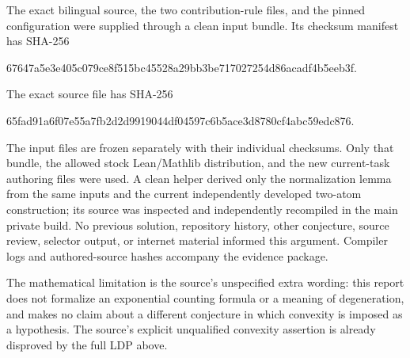 \documentclass[11pt]{article}
\begin{document}
The exact bilingual source, the two contribution-rule files, and the pinned
configuration were supplied through a clean input bundle. Its checksum
manifest has SHA-256
\begin{center}\small\ttfamily
67647a5e3e405c079ce8f515bc45528a29bb3be717027254d86acadf4b5eeb3f.
\end{center}
The exact source file has SHA-256
\begin{center}\small\ttfamily
65fad91a6f07e55a7fb2d2d9919044df04597c6b5ace3d8780cf4abc59edc876.
\end{center}
The input files are frozen separately with their individual checksums.
Only that bundle, the allowed stock Lean/Mathlib distribution, and the new
current-task authoring files were used. A clean helper derived only the
normalization lemma from the same inputs and the current independently
developed two-atom construction; its source was inspected and independently
recompiled in the main private build. No previous solution, repository
history, other conjecture, source review, selector output, or internet
material informed this argument. Compiler logs and authored-source hashes
accompany the evidence package.

The mathematical limitation is the source's unspecified extra wording:
this report does not formalize an exponential counting formula or a meaning
of degeneration, and makes no claim about a different conjecture in which
convexity is imposed as a hypothesis. The source's explicit unqualified
convexity assertion is already disproved by the full LDP above.
\end{document}
